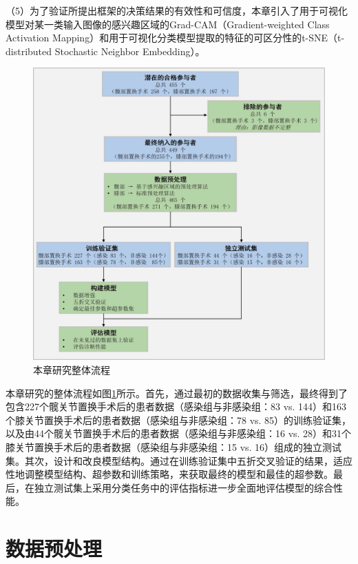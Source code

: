 （5）为了验证所提出框架的决策结果的有效性和可信度，本章引入了用于可视化模型对某一类输入图像的感兴趣区域的Grad-CAM（Gradient-weighted Class Activation Mapping）\cite{selvaraju2017grad}和用于可视化分类模型提取的特征的可区分性的t-SNE（t-distributed Stochastic Neighbor Embedding）\cite{van2008visualizing}。

\begin{figure}[htbp]
  \centering
  \includegraphics[width=\textwidth]{figures/chap03_workflow.jpg}
  \caption{本章研究整体流程}
  \label{fig:chap03_workflow}
\end{figure}

本章研究的整体流程如图\ref{fig:chap03_workflow}所示。首先，通过最初的数据收集与筛选，最终得到了包含227个髋关节置换手术后的患者数据（感染组与非感染组：83 vs. 144）和163个膝关节置换手术后的患者数据（感染组与非感染组：78 vs. 85）的训练验证集，以及由44个髋关节置换手术后的患者数据（感染组与非感染组：16 vs. 28）和31个膝关节置换手术后的患者数据（感染组与非感染组：15 vs. 16）组成的独立测试集。其次，设计和改良模型结构。通过在训练验证集中五折交叉验证的结果，适应性地调整模型结构、超参数和训练策略，来获取最终的模型和最佳的超参数。最后，在独立测试集上采用分类任务中的评估指标进一步全面地评估模型的综合性能。

\section{数据预处理}


